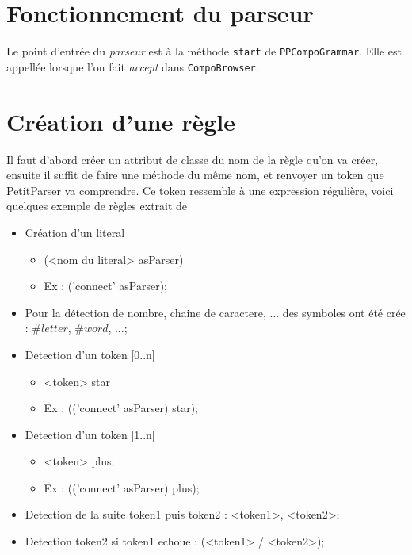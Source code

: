 \documentclass[11pt,a4paper,openany,oneside]{book}
\begin{document}
\begin{appendices}
\section*{Fonctionnement du parseur}
Le point d'entrée du \textit{parseur} est à la méthode \texttt{start} de \texttt{PPCompoGrammar}. Elle est appellée lorsque l'on fait \textit{accept} dans \texttt{CompoBrowser}.

\section*{Création d'une règle}
Il faut d'abord créer un attribut de classe du nom de la règle qu'on va créer, ensuite il suffit de faire une méthode du même nom, 
et renvoyer un token que PetitParser va comprendre. Ce token ressemble à une expression régulière, voici quelques exemple de règles extrait de \citep{rulesParseur}
\begin{itemize}
\item  Création d'un literal
    \begin{itemize}
    \item (<nom du literal> asParser) 
    \item Ex :  ('connect' asParser);
    \end{itemize}
\item  Pour la détection de nombre, chaine de caractere, ... des symboles ont été crée : $\#letter$, $\#word$, ...;

\item Detection d'un token [0..n]
    \begin{itemize}
    \item <token> star
    \item Ex : (('connect' asParser) star); 
    \end{itemize}

\item Detection d'un token [1..n]
    \begin{itemize}
    \item <token> plus;
    \item  Ex : (('connect' asParser) plus); 
    \end{itemize}

\item Detection de la suite token1 puis token2 : <token1>, <token2>;
\item  Detection token2 si token1 echoue : (<token1> / <token2>);
\end{itemize}



\end{appendices}
\end{document}
